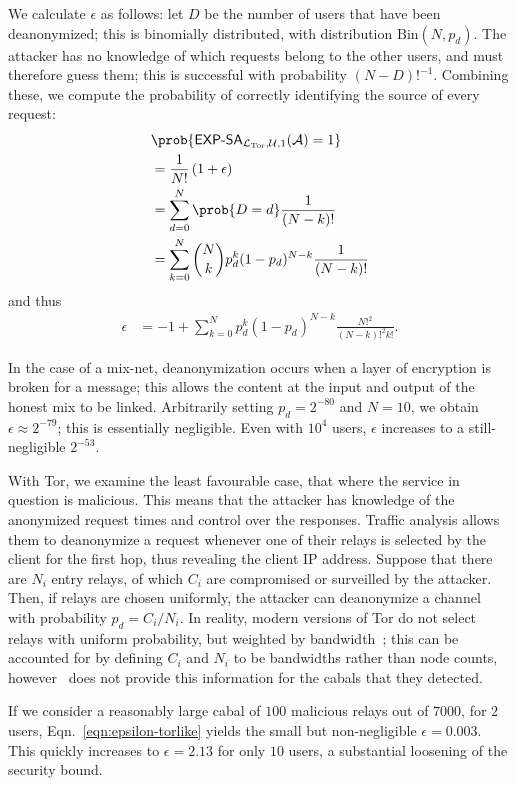 \documentclass[USenglish]{llncs}
\newcommand{\expsa}{\textsf{\textup{EXP-SA}}}
\begin{document}
We calculate $\epsilon$ as follows: let $D$ be the number of users that have been
deanonymized; this is binomially distributed, with distribution $\mathrm{Bin}(N, p_d)$.
The attacker has no knowledge of which requests belong to the other users, and must
therefore guess them; this is successful with probability $(N-D)!^{-1}$.  Combining these,
we compute the probability of correctly identifying the source of every request:
\begin{align}
	&\prob{\expsa_{\mathcal{L}_\mathrm{Tor},\mathcal{U},1}(\mathcal{A}) = 1} \\ &= \frac{1}{N!}\left(1+\epsilon\right) \\
		&= \sum_{d = 0}^{N} \prob{D=d} \frac{1}{(N-k)!} \\
		&= \sum_{k = 0}^{N} {N \choose k} p_d^k (1-p_d)^{N-k} \frac{1}{(N-k)!}
\end{align}
and thus
\begin{align}
	 \epsilon
		 &= -1 + \sum_{k = 0}^{N} p_d^k (1-p_d)^{N-k} \frac{N!^2}{(N-k)!^2 k!} \label{eqn:epsilon-torlike}.
\end{align}

In the case of a mix-net, deanonymization occurs when a layer of encryption is broken
for a message; this allows the content at the input and output of the honest mix to be
linked.  Arbitrarily setting $p_d = 2^{-80}$ and $N=10$, we obtain
$\epsilon \approx 2^{-79}$; this is essentially negligible. Even with $10^4$ users,
$\epsilon$ increases to a still-negligible $2^{-53}$.

With Tor,
we examine the least favourable case, that where the service in question is malicious.  This means
that the attacker has knowledge of the anonymized request times and control over the
responses.  Traffic analysis allows them to deanonymize a request whenever one of their
relays is selected by the client for the first hop, thus revealing the client IP address.  Suppose that
there are $N_i$ entry relays, of which $C_i$ are compromised or surveilled by the attacker.  Then,
if relays are chosen uniformly, the attacker can deanonymize a channel with
probability $p_d = C_i/N_i$.  In reality, modern versions of Tor do not select relays
with uniform probability, but weighted by bandwidth~\cite{elahi-changing-of-the-guards};
this can be accounted for by defining $C_i$ and $N_i$ to be bandwidths rather
than node counts, however~\cite{sybilhunter} does not provide this information
for the cabals that they detected.

If we consider a reasonably large cabal of $100$ malicious relays out of $7000$, for $2$ users,
Eqn.~\ref{eqn:epsilon-torlike} yields the small but non-negligible $\epsilon = 0.003$.  This quickly increases to
$\epsilon=2.13$ for only $10$ users, a substantial loosening of the security
bound.  
\end{document}
